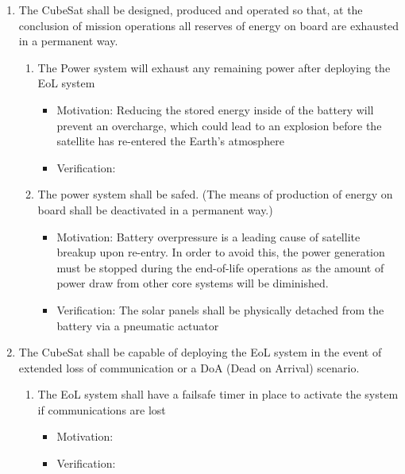 \documentclass{ece}
\begin{document}
\begin{enumerate}
\begin{enumerate}
\begin{enumerate}
\begin{itemize}
            \end{itemize}
        \end{enumerate}
        \item The CubeSat shall be designed, produced and operated so that, at the conclusion of mission operations all reserves of energy on board are exhausted in a permanent way.
        \begin{enumerate}
            \item The Power system will exhaust any remaining power after deploying the EoL system 
                \begin{itemize}
        \item Motivation: Reducing the stored energy inside of the battery will prevent an overcharge, which could lead to an explosion before the satellite has re-entered the Earth’s atmosphere
        \item Verification: 
                \end{itemize}
            \item The power system shall be safed. (The means of production of energy on board shall be deactivated in a permanent way.) 
                \begin{itemize}
                        \item Motivation: Battery overpressure is a leading cause of satellite breakup upon re-entry. In order to avoid this, the power generation must be stopped during the end-of-life operations as the amount of power draw from other core systems will be diminished.
                        \item Verification: The solar panels shall be physically detached from the battery via a pneumatic actuator 
                \end{itemize}
             \end{enumerate} 
            \item The CubeSat shall be capable of deploying the EoL system in the event of extended loss of communication or a DoA (Dead on Arrival) scenario. 
            \begin{enumerate}
                \item The EoL system shall have a failsafe timer in place to activate the system if communications are lost 
                \begin{itemize}
                    \item Motivation:
                    \item Verification: 
                \end{itemize}

\end{enumerate}
\end{enumerate}
\end{enumerate}
\end{document}
